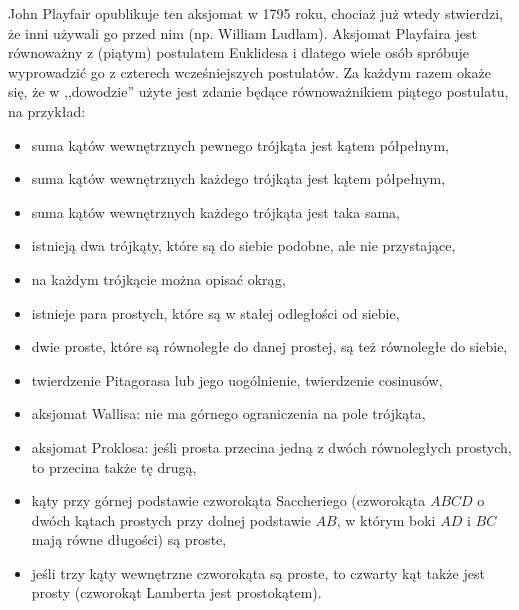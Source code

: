 John Playfair opublikuje ten aksjomat w 1795 roku, chociaż już wtedy stwierdzi, że inni używali go przed nim (np. William Ludlam).
%
%
Aksjomat Playfaira jest równoważny z (piątym) postulatem Euklidesa i dlatego wiele osób spróbuje wyprowadzić go z czterech wcześniejszych postulatów.
Za każdym razem okaże się, że w ,,dowodzie'' użyte jest zdanie będące równoważnikiem piątego postulatu, na przykład:
\begin{itemize}
    \item suma kątów wewnętrznych pewnego trójkąta jest kątem półpełnym,%
    \item suma kątów wewnętrznych każdego trójkąta jest kątem półpełnym,%
    \item suma kątów wewnętrznych każdego trójkąta jest taka sama,%
    \item istnieją dwa trójkąty, które są do siebie podobne, ale nie przystające,%
    \item na każdym trójkącie można opisać okrąg,%
    \item istnieje para prostych, które są w stałej odległości od siebie,
    \item dwie proste, które są równoległe do danej prostej, są też równoległe do siebie,%
    \item twierdzenie Pitagorasa lub jego uogólnienie, twierdzenie cosinusów,%
    \item aksjomat Wallisa: nie ma górnego ograniczenia na pole trójkąta,%
    \item aksjomat Proklosa: jeśli prosta przecina jedną z dwóch równoległych prostych, to przecina także tę drugą,%
    \item kąty przy górnej podstawie czworokąta Saccheriego (czworokąta $ABCD$ o dwóch kątach prostych przy dolnej podstawie $AB$, w którym boki $AD$ i $BC$ mają równe długości) są proste,%
    \item jeśli trzy kąty wewnętrzne czworokąta są proste, to czwarty kąt także jest prosty (czworokąt Lamberta jest prostokątem).%
\end{itemize}


